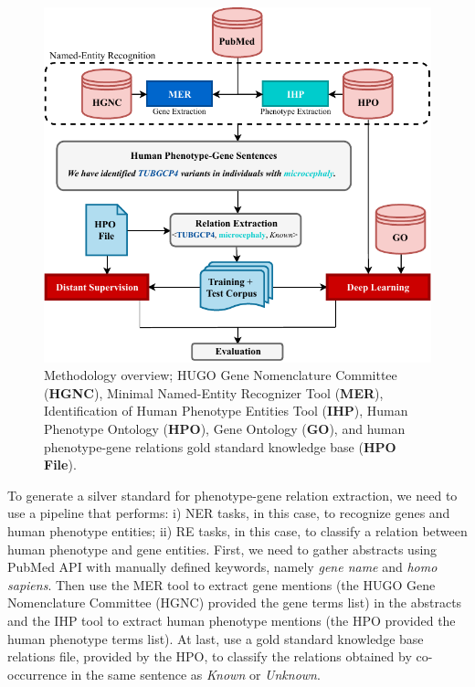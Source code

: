 \documentclass[11pt]{article}
\begin{document}
\begin{figure}[t!]
\captionsetup{font=small}
\renewcommand\thefigure{3.1}
\centering
\includegraphics[width=13cm]{methods.pdf}
\fontsize{9}{10.8}\caption{Methodology overview; HUGO Gene Nomenclature Committee (\textbf{HGNC}), Minimal Named-Entity Recognizer Tool (\textbf{MER}), Identification of Human Phenotype Entities Tool (\textbf{IHP}), Human Phenotype Ontology (\textbf{HPO}), Gene Ontology (\textbf{GO}), and human phenotype-gene relations gold standard knowledge base (\textbf{HPO File}).}
\label{figure:methodology}
\end{figure}

To generate a silver standard for phenotype-gene relation extraction, we need to use a pipeline that performs: i) NER tasks, in this case, to recognize genes and human phenotype entities; ii) RE tasks, in this case, to classify a relation between human phenotype and gene entities. First, we need to gather abstracts using PubMed API with manually defined keywords, namely \textit{gene name} and \textit{homo sapiens}. Then use the MER tool \cite{MER} to extract gene mentions (the HUGO Gene Nomenclature Committee (HGNC) provided the gene terms list) in the abstracts and the IHP tool \cite{IHP} to extract human phenotype mentions (the HPO provided the human phenotype terms list). At last, use a gold standard knowledge base relations file, provided by the HPO, to classify the relations obtained by co-occurrence in the same sentence as \textit{Known} or \textit{Unknown}.
\end{document}
